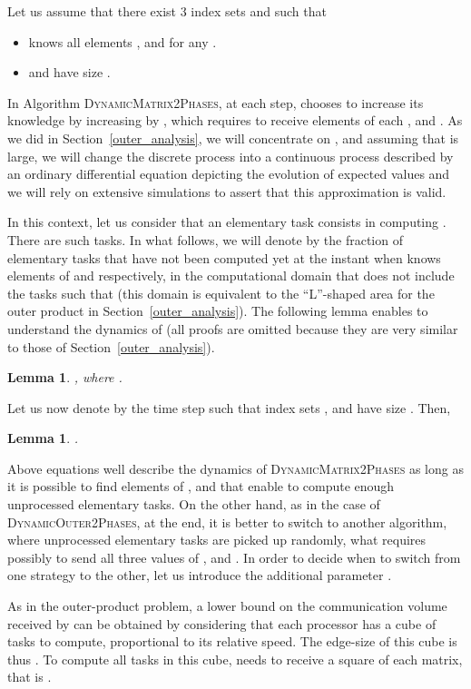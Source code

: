 \documentclass[a4paper,10pt]{article}
\newtheorem{lemma}[theorem]{Lemma}
\newcommand{\stupidthreshold}{\textsc{Dynamic\-Outer\-2Phases}\xspace}
\newcommand{\stupidthresholdmat}{\textsc{Dynamic\-Matrix\-2Phases}\xspace}
\begin{document}
Let us assume that there exist 3 index sets  and  such that 
\begin{itemize}
\item  knows all elements ,  and  for
  any .
\item  and  have size .
\end{itemize}

In Algorithm \stupidthresholdmat, at each step,  chooses to increase its
knowledge by increasing  by , which requires to receive 
elements of each ,  and . As we did in
Section~\ref{outer_analysis}, we will concentrate on , and
assuming that  is large, we will change the discrete process into a
continuous process described by an ordinary differential equation
depicting the evolution of expected values and we will rely on
extensive simulations to assert that this approximation is valid.

In this context, let us consider that an elementary task 
consists in computing . There are  such
tasks. In what follows, we will denote by  the fraction of
elementary tasks that have not been computed yet at the instant when
 knows  elements of  and  respectively, in the
computational domain that does not include the tasks  such
that  (this domain is equivalent to the
``L''-shaped area for the outer product in Section~\ref{outer_analysis}). The following lemma enables to
understand the dynamics of  (all proofs are omitted because they
are very similar to those of Section~\ref{outer_analysis}).

\begin{lemma}
\label{lemgm}
, where .
\end{lemma}


Let us now denote by  the time step such that index sets ,  and  have size .
Then,
\begin{lemma}
\label{lemTm}
.
\end{lemma}

Above equations well describe the dynamics of \stupidthresholdmat as long as it
is possible to find elements of ,  and  that enable to
compute enough unprocessed elementary tasks. On the other hand, as in
the case of \stupidthreshold, at the end, it is better to switch to another
algorithm, where unprocessed elementary tasks  are
picked up randomly, what requires possibly to send all three values of
,  and . In order to decide when to switch
from one strategy to the other, let us introduce the additional
parameter .


As in the outer-product problem, a lower bound on the communication
volume received by  can be obtained by considering that each
processor has a cube of tasks  to compute, proportional to
its relative speed. The edge-size of this cube is thus .
To compute all tasks in this cube,  needs to receive a square of
each matrix, that is . 
\end{document}
